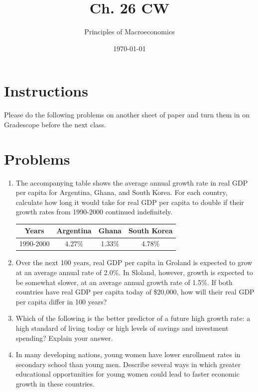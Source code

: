 \documentclass{article}
\title{Ch. 26 CW}
\author{Principles of Macroeconomics}
\date{\today}
\begin{document}
\maketitle

\section*{Instructions}

Please do the following problems on another sheet of paper and turn them in on Gradescope before the next class.

\section*{Problems}

\begin{enumerate}

\item The accompanying table shows the average annual growth rate in real GDP per capita for Argentina, Ghana, and South Korea.  For each country, calculate how long it would take for real GDP per capita to double if their growth rates from 1990-2000 continued indefinitely.

	\begin{center}
	\begin{tabular}{| c | c | c | c |}
	\hline
	Years & Argentina & Ghana & South Korea \\
	\hline
	1990-2000 & 4.27\% & 1.33\% & 4.78\% \\
	\hline
	\end{tabular}
	\end{center}
	
\item Over the next 100 years, real GDP per capita in Groland is expected to grow at an average annual rate of 2.0\%. In Sloland, however, growth is expected to be somewhat slower, at an average annual growth rate of 1.5\%. If both countries have real GDP per capita today of \$20,000, how will their real GDP per capita differ in 100 years?

\item Which of the following is the better predictor of a future high growth rate: a high standard of living today or high levels of savings and investment spending? Explain your answer. 

\item In many developing nations, young women have lower enrollment rates in secondary school than young men. Describe several ways in which greater educational opportunities for young women could lead to faster economic growth in these countries.


\end{enumerate}
\end{document}
